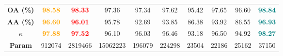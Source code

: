 \begin{table}[!hbt]
{\begin{tabular}{c|cccccccc|c}
            \textbf{OA (\%)}  & \textcolor{orange}{\textbf{98.58}} & \textcolor{red}{\textbf{98.33}} & 97.36 & 97.34 & 97.62 & 95.42 & 97.65 & 96.60 &  \textcolor{teal}{\textbf{98.84}} \\ 
            \textbf{AA (\%)}    & \textcolor{orange}{\textbf{96.60}}& \textcolor{red}{\textbf{96.01}}  & 95.78 & 92.69 & 93.85 & 86.38 & 93.92 & 86.55 &  \textcolor{teal}{\textbf{96.93}}\\ 
            \textbf{$\kappa$} & \textcolor{orange}{\textbf{97.88}} & \textcolor{red}{\textbf{97.52}} & 96.10 & 96.03 & 96.46 & 93.18 & 96.50 & 94.92 &  \textcolor{teal}{\textbf{98.27}} \\ \hline
            
            \textbf{Param} & \num{912074} &\num{2819466} & \num{15062223} &\num{196079} & \num{224298} & \num{23504} & \num{22186} & \num{25162} & \num{37150} \\ \hline
    \end{tabular}}
    \label{tab:PI}
\end{table}












